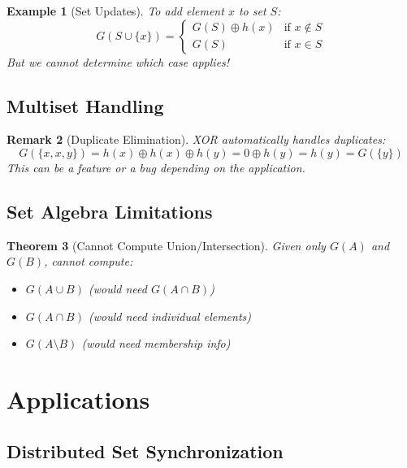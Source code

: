 \documentclass[11pt,final,hidelinks]{article}
\newcommand{\XOR}{\oplus}
\newtheorem{theorem}{Theorem}[section]
\newtheorem{example}[theorem]{Example}
\newtheorem{remark}[theorem]{Remark}
\begin{document}
\begin{example}[Set Updates]
To add element $x$ to set $S$:
\begin{equation}
G(S \cup \{x\}) = \begin{cases}
G(S) \XOR h(x) & \text{if } x \notin S\\
G(S) & \text{if } x \in S
\end{cases}
\end{equation}
But we cannot determine which case applies!
\end{example}

\subsection{Multiset Handling}

\begin{remark}[Duplicate Elimination]
XOR automatically handles duplicates:
\begin{equation}
G(\{x, x, y\}) = h(x) \XOR h(x) \XOR h(y) = 0 \XOR h(y) = h(y) = G(\{y\})
\end{equation}
This can be a feature or a bug depending on the application.
\end{remark}

\subsection{Set Algebra Limitations}

\begin{theorem}[Cannot Compute Union/Intersection]
Given only $G(A)$ and $G(B)$, cannot compute:
\begin{itemize}
    \item $G(A \cup B)$ (would need $G(A \cap B)$)
    \item $G(A \cap B)$ (would need individual elements)
    \item $G(A \setminus B)$ (would need membership info)
\end{itemize}
\end{theorem}

\section{Applications}

\subsection{Distributed Set Synchronization}
\end{document}

